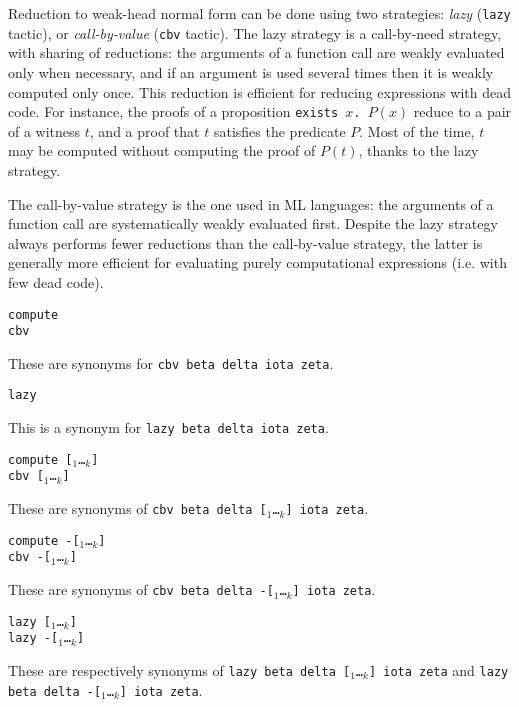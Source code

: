 \begin{coq_example*}
Reduction to weak-head normal form can be done using two strategies:
{\em lazy} ({\tt lazy} tactic), or {\em call-by-value} ({\tt cbv}
tactic). The lazy strategy is a call-by-need strategy, with sharing of
reductions: the arguments of a function call are weakly evaluated only
when necessary, and if an argument is used several times then it is
weakly computed only once. This reduction is efficient for reducing
expressions with dead code. For instance, the proofs of a proposition
{\tt exists~$x$. $P(x)$} reduce to a pair of a witness $t$, and a
proof that $t$ satisfies the predicate $P$. Most of the time, $t$ may
be computed without computing the proof of $P(t)$, thanks to the lazy
strategy.

The call-by-value strategy is the one used in ML languages: the
arguments of a function call are systematically weakly evaluated
first. Despite the lazy strategy always performs fewer reductions than
the call-by-value strategy, the latter is generally more efficient for
evaluating purely computational expressions (i.e. with few dead code).

\begin{Variants}
\item {\tt compute} \\
      {\tt cbv}

  These are synonyms for {\tt cbv beta delta iota zeta}.

\item {\tt lazy}

  This is a synonym for {\tt lazy beta delta iota zeta}.

\item {\tt compute [\qualid$_1$\ldots\qualid$_k$]}\\
      {\tt cbv [\qualid$_1$\ldots\qualid$_k$]}

  These are synonyms of {\tt cbv beta delta
  [\qualid$_1$\ldots\qualid$_k$] iota zeta}.

\item {\tt compute -[\qualid$_1$\ldots\qualid$_k$]}\\
      {\tt cbv -[\qualid$_1$\ldots\qualid$_k$]}

  These are synonyms of {\tt cbv beta delta
  -[\qualid$_1$\ldots\qualid$_k$] iota zeta}.

\item {\tt lazy [\qualid$_1$\ldots\qualid$_k$]}\\
      {\tt lazy -[\qualid$_1$\ldots\qualid$_k$]}

  These are respectively synonyms of {\tt lazy beta delta
  [\qualid$_1$\ldots\qualid$_k$] iota zeta} and {\tt lazy beta delta
  -[\qualid$_1$\ldots\qualid$_k$] iota zeta}.


\end{Variants}
\end{coq_example*}
